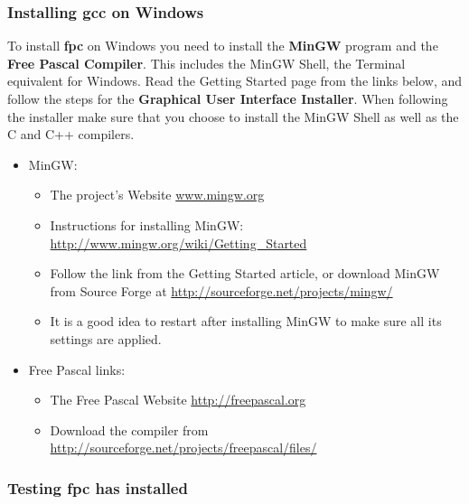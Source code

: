 
\subsubsection{Installing gcc on Windows} %
\label{ssub:installing_gcc_on_windows}

To install \textbf{fpc} on Windows you need to install the \textbf{MinGW} program and the \textbf{Free Pascal Compiler}. This includes the MinGW Shell, the Terminal equivalent for Windows. Read the Getting Started page from the links below, and follow the steps for the \textbf{Graphical User Interface Installer}. When following the installer make sure that you choose to install the MinGW Shell as well as the C and C++ compilers.

\begin{itemize}
  \item MinGW:
  \begin{itemize}
    \item The project's Website \url{www.mingw.org}
    \item Instructions for installing MinGW: \url{http://www.mingw.org/wiki/Getting_Started}
    \item Follow the link from the Getting Started article, or download MinGW from Source Forge at \url{http://sourceforge.net/projects/mingw/}
    \item It is a good idea to restart after installing MinGW to make sure all its settings are applied.
  \end{itemize}

  \item Free Pascal links:
  \begin{itemize}
    \item The Free Pascal Website \url{http://freepascal.org}
    \item Download the compiler from \url{http://sourceforge.net/projects/freepascal/files/} 
  \end{itemize}
  
\end{itemize}



\subsubsection{Testing fpc has installed} %
\label{ssub:testing_your_install_fpc}

